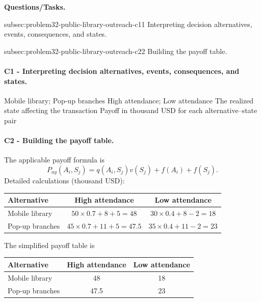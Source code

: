 	\textbf{Questions/Tasks.}
	\begin{enumerate}
	\CriterionTask
	{subsec:problem32-public-library-outreach-c1}{1}
	{Interpreting decision alternatives, events, consequences, and states.}

	\CriterionTask
	{subsec:problem32-public-library-outreach-c2}{2}
	{Building the payoff table.}
	\end{enumerate}

	\paragraph*{C1 - Interpreting decision alternatives, events, consequences, and states.}
	\label{subsec:problem32-public-library-outreach-c1}
	\DecisionElementsTable
	{Mobile library; Pop-up branches}
	{High attendance; Low attendance}
	{The realized state affecting the transaction}
	{Payoff in thousand USD for each alternative--state pair}

	\paragraph*{C2 - Building the payoff table.}
	\label{subsec:problem32-public-library-outreach-c2}
	The applicable payoff formula is
	\[ P_{ay}(A_i,S_j)=q(A_i,S_j)v(S_j)+f(A_i)+f(S_j). \]
	Detailed calculations (thousand USD):
	\begin{center}\small
	\begin{tabular}{lcc}
	\toprule
	Alternative & High attendance & Low attendance \\
	\midrule
	Mobile library & $50\times 0.7+8+5=48$ & $30\times 0.4+8-2=18$ \\
Pop-up branches & $45\times 0.7+11+5=47.5$ & $35\times 0.4+11-2=23$ \\
	\bottomrule
	\end{tabular}
	\end{center}
	The simplified payoff table is
	\begin{center}
	\begin{tabular}{lcc}
	\toprule
	Alternative & High attendance & Low attendance \\
	\midrule
	Mobile library & 48 & 18 \\
Pop-up branches & 47.5 & 23 \\
	\bottomrule
	\end{tabular}
	\end{center}

